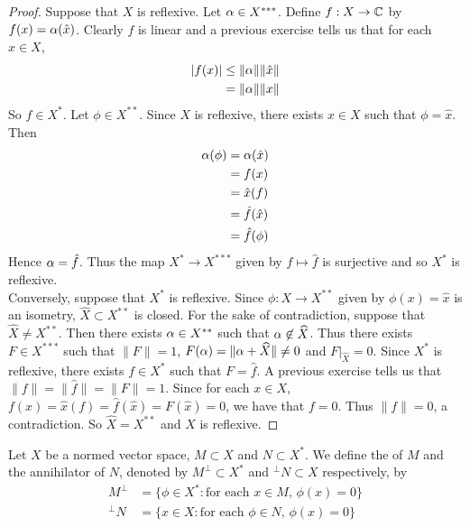 \documentclass{book}
\begin{document}
	\begin{proof}
		Suppose that $X$ is reflexive. Let $\alpha \in X^{***}$. Define $f :X \rightarrow \mathbb{C}$ by $f(x) = \alpha(\hat{x})$. Clearly $f$ is linear and a previous exercise tells us that for each $x \in X$, 
		\begin{align*}
			\vert f(x) \vert 
			& \leq \|\alpha \|\|\hat{x} \|\\
			&= \|\alpha \|\|x \|
		\end{align*}
		So $f \in X^*$.
		Let $\phi \in X^{**}$. Since $X$ is reflexive, there exists $x \in X$ such that $\phi = \hat{x}$. Then 
		\begin{align*}
			\alpha(\phi)
			&= \alpha(\hat{x})\\
			&= f(x)\\
			&= \hat{x}(f)\\
			&= \hat{f}(\hat{x})\\
			&= \hat{f}(\phi)
		\end{align*}
		Hence $\alpha = \hat{f}$. Thus the map $X^* \rightarrow X^{***}$ given by $f \mapsto \hat{f} $ is surjective and so $X^{*}$ is reflexive.\vspace{.5cm}\\
		Conversely, suppose that $X^*$ is reflexive. Since $\phi:X \rightarrow X^{**}$ given by $\phi(x) = \hat{x}$ is an isometry, $\widehat{X} \subset X^{**}$ is closed. For the sake of contradiction, suppose that $\widehat{X} \neq X^{**}$. Then there exists $\alpha \in X^{**}$ such that $\alpha \not \in \widehat{X}$. Thus there exists $F \in X^{***}$ such that $\|F \|= 1$, $F(\alpha) = \|\alpha + \widehat{X} \|\neq 0$ and $F|_{\widehat{X}}=0$. Since $X^*$ is reflexive, there exists $f \in X^*$ such that $F = \hat{f}$. A previous exercise tells us that $\|f \|= \|\hat{f} \|= \|F \|= 1$. Since for each $x \in X$, $f(x) = \hat{x}(f) = \hat{f}(\hat{x}) = F(\hat{x}) = 0$, we have that $f = 0$. Thus $\|f \|= 0$, a contradiction. So $\widehat{X} = X^{**}$ and $X$ is reflexive.
		
	\end{proof}
	
	
	\begin{defn}
	Let $X$ be a normed vector space, $M \subset X$ and $N \subset X^*$. We define the  of $M$ and the annihilator of $N$, denoted by $M^{\perp} \subset X^*$ and $^{\perp}N \subset X$ respectively, by 
	\begin{align*}
	 M^{\perp} &= \{\phi \in X^*: \text{for each $x \in M$, $\phi(x) = 0$}\} \\
	 ^{\perp}N &= \{x \in X: \text{for each $\phi \in N$, $\phi(x) = 0$}\}
	\end{align*}
	\end{defn}	
	
\end{document}
